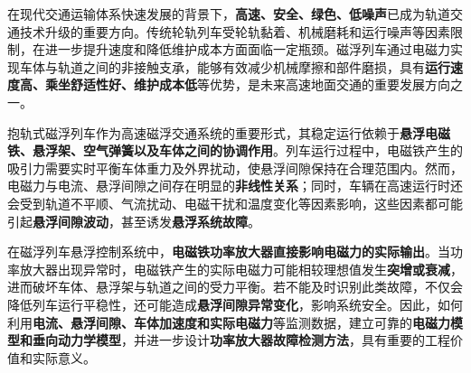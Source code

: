 
\setlength{\parindent}{2em} {在现代交通运输体系快速发展的背景下，\textbf{高速、安全、绿色、低噪声}已成为轨道交通技术升级的重要方向。传统轮轨列车受轮轨黏着、机械磨耗和运行噪声等因素限制，在进一步提升速度和降低维护成本方面面临一定瓶颈。磁浮列车通过电磁力实现车体与轨道之间的非接触支承，能够有效减少机械摩擦和部件磨损，具有\textbf{运行速度高、乘坐舒适性好、维护成本低}等优势，是未来高速地面交通的重要发展方向之一。

抱轨式磁浮列车作为高速磁浮交通系统的重要形式，其稳定运行依赖于\textbf{悬浮电磁铁、悬浮架、空气弹簧以及车体之间的协调作用}。列车运行过程中，电磁铁产生的吸引力需要实时平衡车体重力及外界扰动，使悬浮间隙保持在合理范围内。然而，电磁力与电流、悬浮间隙之间存在明显的\textbf{非线性关系}；同时，车辆在高速运行时还会受到轨道不平顺、气流扰动、电磁干扰和温度变化等因素影响，这些因素都可能引起\textbf{悬浮间隙波动}，甚至诱发\textbf{悬浮系统故障}。

在磁浮列车悬浮控制系统中，\textbf{电磁铁功率放大器直接影响电磁力的实际输出}。当功率放大器出现异常时，电磁铁产生的实际电磁力可能相较理想值发生\textbf{突增或衰减}，进而破坏车体、悬浮架与轨道之间的受力平衡。若不能及时识别此类故障，不仅会降低列车运行平稳性，还可能造成\textbf{悬浮间隙异常变化}，影响系统安全。因此，如何利用\textbf{电流、悬浮间隙、车体加速度和实际电磁力}等监测数据，建立可靠的\textbf{电磁力模型和垂向动力学模型}，并进一步设计\textbf{功率放大器故障检测方法}，具有重要的工程价值和实际意义。}